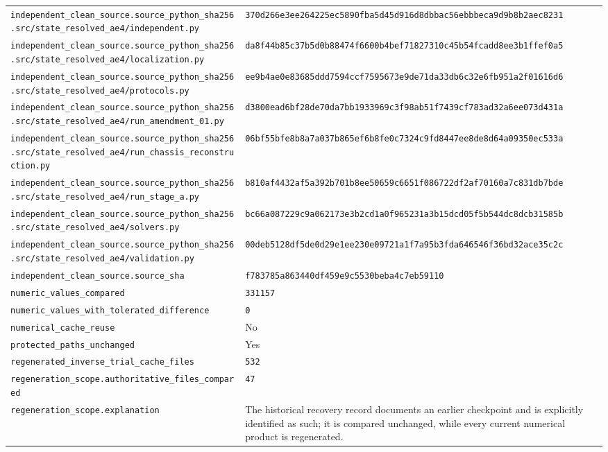 \begin{longtable}{p{.46\linewidth}p{.46\linewidth}}
\nolinkurl{independent_clean_source.source_python_sha256.src/state_resolved_ae4/independent.py} & \nolinkurl{370d266e3ee264225ec5890fba5d45d916d8dbbac56ebbbeca9d9b8b2aec8231} \\
\nolinkurl{independent_clean_source.source_python_sha256.src/state_resolved_ae4/localization.py} & \nolinkurl{da8f44b85c37b5d0b88474f6600b4bef71827310c45b54fcadd8ee3b1ffef0a5} \\
\nolinkurl{independent_clean_source.source_python_sha256.src/state_resolved_ae4/protocols.py} & \nolinkurl{ee9b4ae0e83685ddd7594ccf7595673e9de71da33db6c32e6fb951a2f01616d6} \\
\nolinkurl{independent_clean_source.source_python_sha256.src/state_resolved_ae4/run_amendment_01.py} & \nolinkurl{d3800ead6bf28de70da7bb1933969c3f98ab51f7439cf783ad32a6ee073d431a} \\
\nolinkurl{independent_clean_source.source_python_sha256.src/state_resolved_ae4/run_chassis_reconstruction.py} & \nolinkurl{06bf55bfe8b8a7a037b865ef6b8fe0c7324c9fd8447ee8de8d64a09350ec533a} \\
\nolinkurl{independent_clean_source.source_python_sha256.src/state_resolved_ae4/run_stage_a.py} & \nolinkurl{b810af4432af5a392b701b8ee50659c6651f086722df2af70160a7c831db7bde} \\
\nolinkurl{independent_clean_source.source_python_sha256.src/state_resolved_ae4/solvers.py} & \nolinkurl{bc66a087229c9a062173e3b2cd1a0f965231a3b15dcd05f5b544dc8dcb31585b} \\
\nolinkurl{independent_clean_source.source_python_sha256.src/state_resolved_ae4/validation.py} & \nolinkurl{00deb5128df5de0d29e1ee230e09721a1f7a95b3fda646546f36bd32ace35c2c} \\
\nolinkurl{independent_clean_source.source_sha} & \nolinkurl{f783785a863440df459e9c5530beba4c7eb59110} \\
\nolinkurl{numeric_values_compared} & \texttt{331157} \\
\nolinkurl{numeric_values_with_tolerated_difference} & \texttt{0} \\
\nolinkurl{numerical_cache_reuse} & No \\
\nolinkurl{protected_paths_unchanged} & Yes \\
\nolinkurl{regenerated_inverse_trial_cache_files} & \texttt{532} \\
\nolinkurl{regeneration_scope.authoritative_files_compared} & \texttt{47} \\
\nolinkurl{regeneration_scope.explanation} & The historical recovery record documents an earlier checkpoint and is explicitly identified as such; it is compared unchanged, while every current numerical product is regenerated. \\

\end{longtable}
